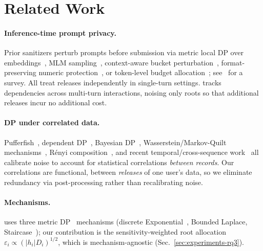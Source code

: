 \section{Related Work}
\label{sec:related-work}

\paragraph{Inference-time prompt privacy.}
Prior sanitizers perturb prompts before submission via metric local DP over embeddings~\cite{yue2021santext,chen2022custext}, MLM sampling~\cite{dp-mlm}, context-aware bucket perturbation~\cite{wu2025capecontextawarepromptperturbation}, format-preserving numeric protection~\cite{chowdhury2025}, or token-level budget allocation~\cite{SYBW}; see~\cite{edemacu2025privacy} for a survey. All treat releases independently in single-turn settings. \sysname{} tracks dependencies across multi-turn interactions, noising only roots so that additional releases incur no additional cost.

\paragraph{DP under correlated data.}
Pufferfish~\cite{kifer2014pufferfish}, dependent DP~\cite{liu2016dependence}, Bayesian DP~\cite{zhao2019bayesian}, Wasserstein/Markov-Quilt mechanisms~\cite{song2017pufferfish}, R\'enyi composition~\cite{pierquin2024renyi}, and recent temporal/cross-sequence work~\cite{correlated2025csdp} all calibrate noise to account for statistical correlations \emph{between records}. Our correlations are functional, between \emph{releases} of one user's data, so we eliminate redundancy via post-processing rather than recalibrating noise.

\paragraph{Mechanisms.}
\sysname{} uses three metric DP~\cite{Chatzikokolakis2013BroadeningTS} mechanisms (discrete Exponential~\cite{mcsherry2007mechanism}, Bounded Laplace, Staircase~\cite{geng2015optimal}); our contribution is the sensitivity-weighted root allocation $\varepsilon_i \propto (|h_i| D_i)^{1/2}$, which is mechanism-agnostic (Sec.~\ref{sec:experiments-rq3}).

